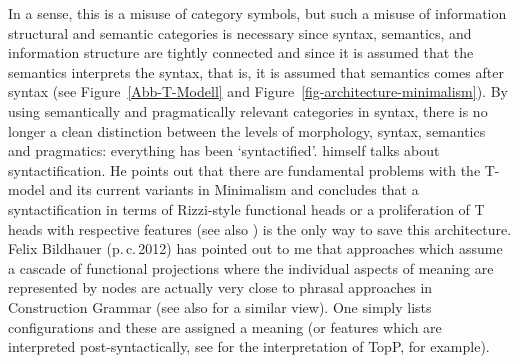 %
In a sense, this is a misuse of category symbols, but such a misuse of information structural and semantic
categories is necessary since syntax, semantics, and information structure are tightly connected
and since it is assumed that the semantics interprets the syntax, that is, it is assumed that semantics comes
after syntax (see Figure~\ref{Abb-T-Modell} and Figure~\ref{fig-architecture-minimalism}). By using
semantically and pragmatically relevant categories in syntax, there is no longer a clean distinction between
the levels of morphology, syntax, semantics and pragmatics: everything has been
`syntactified'. \citet{Rizzi2014a} himself talks about syntactification. He points out that there
are fundamental problems with the T-model and its current
variants in Minimalism and concludes that a syntactification in terms of Rizzi-style functional heads
or a proliferation of T heads with respective features (see also \citealp{Borsley2006a,Borsley:Mueller:2021a}) is the only way to save this architecture. 
Felix Bildhauer (p.\,c.\,2012) has pointed out to me that
approaches which assume a cascade of functional projections where the individual aspects of meaning are represented by nodes are actually very
close to phrasal approaches in Construction Grammar (see \citealp[]{Adger2013a} also for a
similar view). One simply lists configurations and these are assigned a meaning (or features which are 
interpreted post-syntactically, see  for the interpretation of TopP, for
example). 


